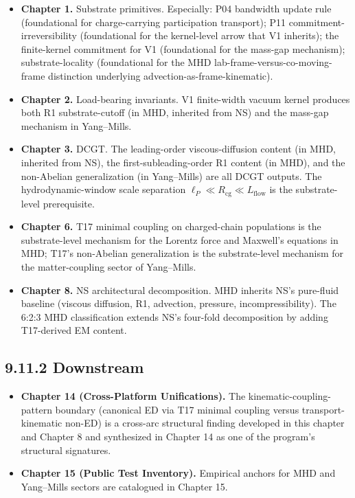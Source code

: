 \documentclass[11pt]{book}
\begin{document}
\begin{itemize}
\item \textbf{Chapter 1.} Substrate primitives. Especially: P04 bandwidth update rule (foundational for charge-carrying participation transport); P11 commitment-irreversibility (foundational for the kernel-level arrow that V1 inherits); the finite-kernel commitment for V1 (foundational for the mass-gap mechanism); substrate-locality (foundational for the MHD lab-frame-versus-co-moving-frame distinction underlying advection-as-frame-kinematic).
\item \textbf{Chapter 2.} Load-bearing invariants. V1 finite-width vacuum kernel produces both R1 substrate-cutoff (in MHD, inherited from NS) and the mass-gap mechanism in Yang–Mills.
\item \textbf{Chapter 3.} DCGT. The leading-order viscous-diffusion content (in MHD, inherited from NS), the first-subleading-order R1 content (in MHD), and the non-Abelian generalization (in Yang–Mills) are all DCGT outputs. The hydrodynamic-window scale separation $\ell_P \ll R_\mathrm{cg} \ll L_\mathrm{flow}$ is the substrate-level prerequisite.
\item \textbf{Chapter 6.} T17 minimal coupling on charged-chain populations is the substrate-level mechanism for the Lorentz force and Maxwell's equations in MHD; T17's non-Abelian generalization is the substrate-level mechanism for the matter-coupling sector of Yang–Mills.
\item \textbf{Chapter 8.} NS architectural decomposition. MHD inherits NS's pure-fluid baseline (viscous diffusion, R1, advection, pressure, incompressibility). The 6:2:3 MHD classification extends NS's four-fold decomposition by adding T17-derived EM content.
\end{itemize}

\subsection{9.11.2 Downstream}

\begin{itemize}
\item \textbf{Chapter 14 (Cross-Platform Unifications).} The kinematic-coupling-pattern boundary (canonical ED via T17 minimal coupling versus transport-kinematic non-ED) is a cross-arc structural finding developed in this chapter and Chapter 8 and synthesized in Chapter 14 as one of the program's structural signatures.
\item \textbf{Chapter 15 (Public Test Inventory).} Empirical anchors for MHD and Yang–Mills sectors are catalogued in Chapter 15.
\end{itemize}
\end{document}
